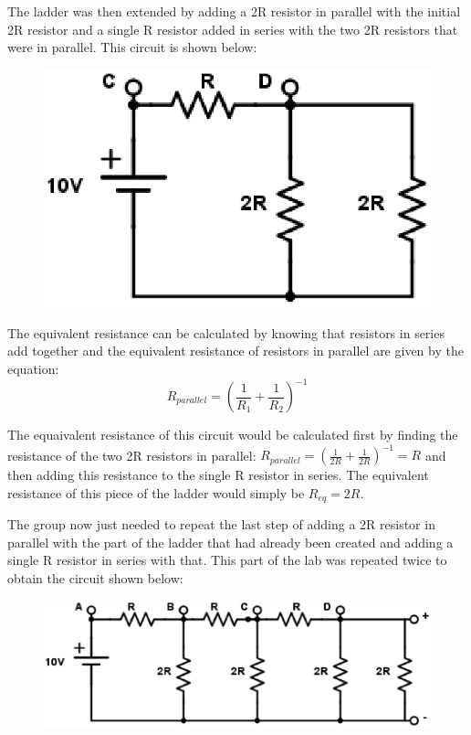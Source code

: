 \documentclass[twocolumn, amsmath]{revtex4}
\begin{document}
The ladder was then extended by adding a 2R resistor in parallel with the initial 2R resistor and a single R resistor added in series with the two 2R resistors that were in parallel. This circuit is shown below:

\begin{figure}[h]  

\includegraphics[scale = 0.4]{C.eps}  
\end{figure}

The equivalent resistance can be calculated by knowing that resistors in series add together and the equivalent resistance of resistors in parallel are given by the equation:
\begin{equation}
R_{parallel} = (\frac{1}{R_1}+\frac{1}{R_2})^{-1}
\end{equation}

The equaivalent resistance of this circuit would be calculated first by finding the resistance of the two 2R resistors in parallel:
$R_{parallel} = (\frac{1}{2R}+\frac{1}{2R})^{-1} = R$
and then adding this resistance to the single R resistor in series. The equivalent resistance of this piece of the ladder would simply be $R_{eq} = 2R$.

The group now just needed to repeat the last step of adding a 2R resistor in parallel with the part of the ladder that had already been created and adding a single R resistor in series with that. This part of the lab was repeated twice to obtain the circuit shown below:

\begin{figure}[h]  

\includegraphics[scale = 0.4]{a.eps}  
\end{figure}
\end{document}
